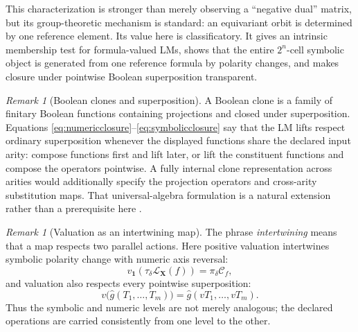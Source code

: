 \documentclass[11pt]{article}
\theoremstyle{definition}
\theoremstyle{remark}
\newtheorem{remark}[theorem]{Remark}
\newcommand{\cC}{\mathcal C}
\begin{document}
This characterization is stronger than merely observing a ``negative dual'' matrix, but its group-theoretic mechanism is standard: an equivariant orbit is determined by one reference element.  Its value here is classificatory.  It gives an intrinsic membership test for formula-valued LMs, shows that the entire $2^n$-cell symbolic object is generated from one reference formula by polarity changes, and makes closure under pointwise Boolean superposition transparent.

\begin{remark}[Boolean clones and superposition]
A Boolean clone is a family of finitary Boolean functions containing projections and closed under superposition.  Equations \eqref{eq:numericclosure}--\eqref{eq:symbolicclosure} say that the LM lifts respect ordinary superposition whenever the displayed functions share the declared input arity: compose functions first and lift later, or lift the constituent functions and compose the operators pointwise.  A fully internal clone representation across arities would additionally specify the projection operators and cross-arity substitution maps.  That universal-algebra formulation is a natural extension rather than a prerequisite here \cite{Post1941}.
\end{remark}

\begin{remark}[Valuation as an intertwining map]
The phrase \emph{intertwining} means that a map respects two parallel actions.  Here positive valuation intertwines symbolic polarity change with numeric axis reversal:
\[
 v_{\mathbf1}\!\left(\tau_\delta\mathcal L_{\mathbf X}(f)\right)
 =\pi_\delta\cC_f,
\]
and valuation also respects every pointwise superposition:
\[
 v\bigl(\widehat g(T_1,\ldots,T_m)\bigr)
 =\widehat g(vT_1,\ldots,vT_m).
\]
Thus the symbolic and numeric levels are not merely analogous; the declared operations are carried consistently from one level to the other.
\end{remark}
\end{document}
